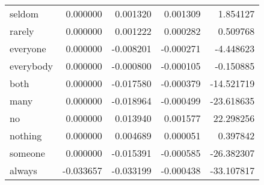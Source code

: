 \begin{table}[ht]
\begin{tabular}{lrrrr}
seldom & {\cellcolor[HTML]{E1EDF3}} \color[HTML]{000000} 0.000000 & {\cellcolor[HTML]{D8E9F1}} \color[HTML]{000000} 0.001320 & {\cellcolor[HTML]{327CB7}} \color[HTML]{F1F1F1} 0.001309 & {\cellcolor[HTML]{C7E0ED}} \color[HTML]{000000} 1.854127 \\
rarely & {\cellcolor[HTML]{E1EDF3}} \color[HTML]{000000} 0.000000 & {\cellcolor[HTML]{D8E9F1}} \color[HTML]{000000} 0.001222 & {\cellcolor[HTML]{1A5899}} \color[HTML]{F1F1F1} 0.000282 & {\cellcolor[HTML]{C7E0ED}} \color[HTML]{000000} 0.509768 \\
everyone & {\cellcolor[HTML]{E1EDF3}} \color[HTML]{000000} 0.000000 & {\cellcolor[HTML]{CFE4EF}} \color[HTML]{000000} -0.008201 & {\cellcolor[HTML]{0E4179}} \color[HTML]{F1F1F1} -0.000271 & {\cellcolor[HTML]{C2DDEC}} \color[HTML]{000000} -4.448623 \\
everybody & {\cellcolor[HTML]{E1EDF3}} \color[HTML]{000000} 0.000000 & {\cellcolor[HTML]{D5E7F1}} \color[HTML]{000000} -0.000800 & {\cellcolor[HTML]{114781}} \color[HTML]{F1F1F1} -0.000105 & {\cellcolor[HTML]{C7E0ED}} \color[HTML]{000000} -0.150885 \\
both & {\cellcolor[HTML]{E1EDF3}} \color[HTML]{000000} 0.000000 & {\cellcolor[HTML]{C0DCEB}} \color[HTML]{000000} -0.017580 & {\cellcolor[HTML]{0C3D73}} \color[HTML]{F1F1F1} -0.000379 & {\cellcolor[HTML]{BDDBEA}} \color[HTML]{000000} -14.521719 \\
many & {\cellcolor[HTML]{E1EDF3}} \color[HTML]{000000} 0.000000 & {\cellcolor[HTML]{BDDBEA}} \color[HTML]{000000} -0.018964 & {\cellcolor[HTML]{09386D}} \color[HTML]{F1F1F1} -0.000499 & {\cellcolor[HTML]{B6D7E8}} \color[HTML]{000000} -23.618635 \\
no & {\cellcolor[HTML]{E1EDF3}} \color[HTML]{000000} 0.000000 & {\cellcolor[HTML]{E3EDF3}} \color[HTML]{000000} 0.013940 & {\cellcolor[HTML]{3A87BD}} \color[HTML]{F1F1F1} 0.001577 & {\cellcolor[HTML]{D4E6F1}} \color[HTML]{000000} 22.298256 \\
nothing & {\cellcolor[HTML]{E1EDF3}} \color[HTML]{000000} 0.000000 & {\cellcolor[HTML]{DBEAF2}} \color[HTML]{000000} 0.004689 & {\cellcolor[HTML]{144E8A}} \color[HTML]{F1F1F1} 0.000051 & {\cellcolor[HTML]{C7E0ED}} \color[HTML]{000000} 0.397842 \\
someone & {\cellcolor[HTML]{E1EDF3}} \color[HTML]{000000} 0.000000 & {\cellcolor[HTML]{C5DFEC}} \color[HTML]{000000} -0.015391 & {\cellcolor[HTML]{073467}} \color[HTML]{F1F1F1} -0.000585 & {\cellcolor[HTML]{B3D6E8}} \color[HTML]{000000} -26.382307 \\
always & {\cellcolor[HTML]{E0ECF3}} \color[HTML]{000000} -0.033657 & {\cellcolor[HTML]{A9D1E5}} \color[HTML]{000000} -0.033199 & {\cellcolor[HTML]{0A3B70}} \color[HTML]{F1F1F1} -0.000438 & {\cellcolor[HTML]{B1D5E7}} \color[HTML]{000000} -33.107817 \\

\end{tabular}
\end{table}
